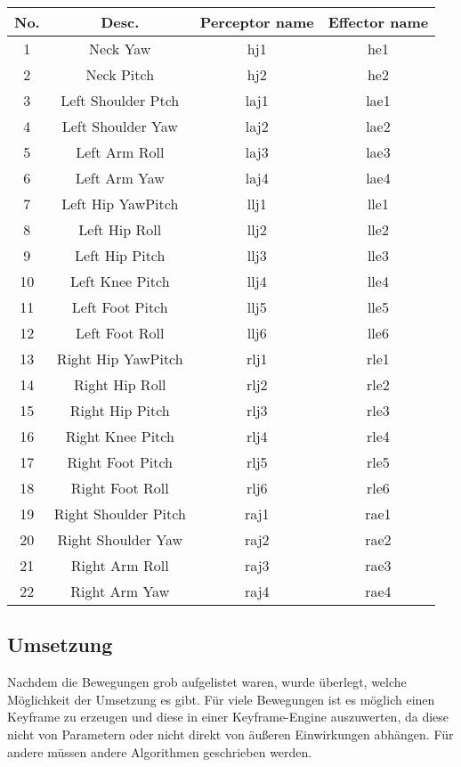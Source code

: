 \begin{tabular}{|c|c|c|c|}
\hline 
No. & Desc. &  Perceptor name & Effector name \\ 
\hline 
1 & Neck Yaw & hj1 & he1 \\ 
\hline 
2 & Neck Pitch & hj2 & he2 \\ 
\hline 
3 & Left Shoulder Ptch & laj1 & lae1 \\ 
\hline 
4 & Left Shoulder Yaw & laj2 & lae2\\ 
\hline 
5 & Left Arm Roll & laj3 & lae3 \\ 
\hline 
6 & Left Arm Yaw & laj4 & lae4 \\ 
\hline 
7 & Left Hip YawPitch & llj1 & lle1 \\ 
\hline 
8 & Left Hip Roll & llj2 & lle2 \\ 
\hline 
9 & Left Hip Pitch & llj3 & lle3 \\ 
\hline 
10 & Left Knee Pitch & llj4 & lle4 \\ 
\hline 
11 & Left Foot Pitch & llj5 & lle5 \\ 
\hline 
12 & Left Foot Roll & llj6 & lle6 \\ 
\hline 
13 & Right Hip YawPitch & rlj1 & rle1 \\ 
\hline 
14 & Right Hip Roll & rlj2 & rle2 \\ 
\hline 
15 & Right Hip Pitch & rlj3 & rle3 \\ 
\hline 
16 & Right Knee Pitch & rlj4 & rle4 \\ 
\hline 
17 & Right Foot Pitch & rlj5 & rle5 \\ 
\hline 
18 & Right Foot Roll & rlj6 & rle6 \\ 
\hline 
19 & Right Shoulder Pitch & raj1 & rae1 \\ 
\hline 
20 & Right Shoulder Yaw & raj2 & rae2 \\ 
\hline 
21 & Right Arm Roll & raj3 & rae3 \\ 
\hline 
22 & Right Arm Yaw & raj4 & rae4 \\ 
\hline 
\end{tabular} 

\subsection{Umsetzung}
Nachdem die Bewegungen grob aufgelistet waren, wurde überlegt, welche
 Möglichkeit der Umsetzung es gibt. Für viele Bewegungen ist es möglich 
einen Keyframe zu erzeugen und diese in einer Keyframe-Engine 
auszuwerten, da diese nicht von Parametern oder nicht direkt von äußeren
 Einwirkungen abhängen. Für andere müssen andere Algorithmen geschrieben
 werden.

